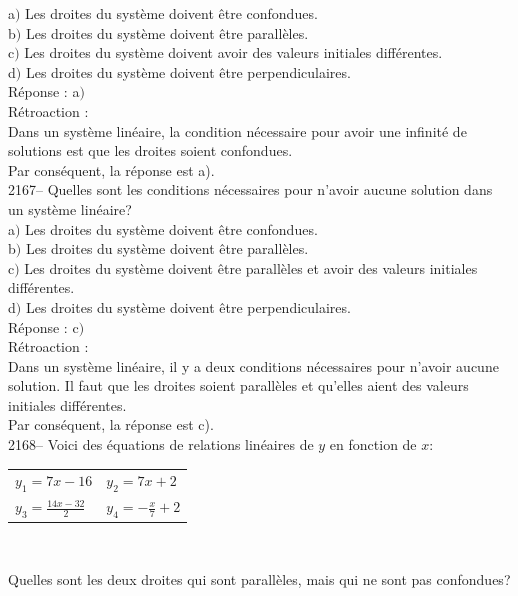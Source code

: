 \documentclass[letterpaper, 12pt]{article}
\begin{document}
a$)$ Les droites du syst\`eme doivent \^etre confondues.\\
b$)$ Les droites du syst\`eme doivent \^etre parall\`eles.\\
c$)$ Les droites du syst\`eme doivent avoir des valeurs initiales diff\'erentes.\\
d$)$ Les droites du syst\`eme doivent \^etre perpendiculaires.\\

R\'eponse : a$)$\\

R\'etroaction :\\
Dans un syst\`eme lin\'eaire, la condition n\'ecessaire pour avoir une infinit\'e de solutions est que les droites soient confondues.\\
Par cons\'equent, la r\'eponse est a).\\

2167--  Quelles sont les conditions n\'ecessaires pour n'avoir aucune solution dans un syst\`eme lin\'eaire?\\

a$)$ Les droites du syst\`eme doivent \^etre confondues.\\
b$)$ Les droites du syst\`eme doivent \^etre parall\`eles.\\
c$)$ Les droites du syst\`eme doivent \^etre parall\`eles et avoir des valeurs initiales diff\'erentes.\\
d$)$ Les droites du syst\`eme doivent \^etre perpendiculaires.\\

R\'eponse : c$)$\\

R\'etroaction :\\
Dans un syst\`eme lin\'eaire, il y a deux conditions n\'ecessaires pour n'avoir aucune solution. Il faut que les droites soient parall\`eles et qu'elles aient des valeurs initiales diff\'erentes.\\
Par cons\'equent, la r\'eponse est c).\\

2168-- Voici des \'equations de relations lin\'eaires de $y$ en fonction de $x$:
\begin{center}
\begin{tabular}{l l}
 $ y_{1}=7x-16 $ &  $ y_{2}=7x+2 $ \\
 $ y_{3}=\frac{14x-32}{2} $ &  $ y_{4}=-\frac{x}{7}+2 $ \\
\end{tabular}\\
\end{center}
Quelles sont les deux droites qui sont parall\`eles, mais qui ne sont pas confondues? \\
\end{document}

